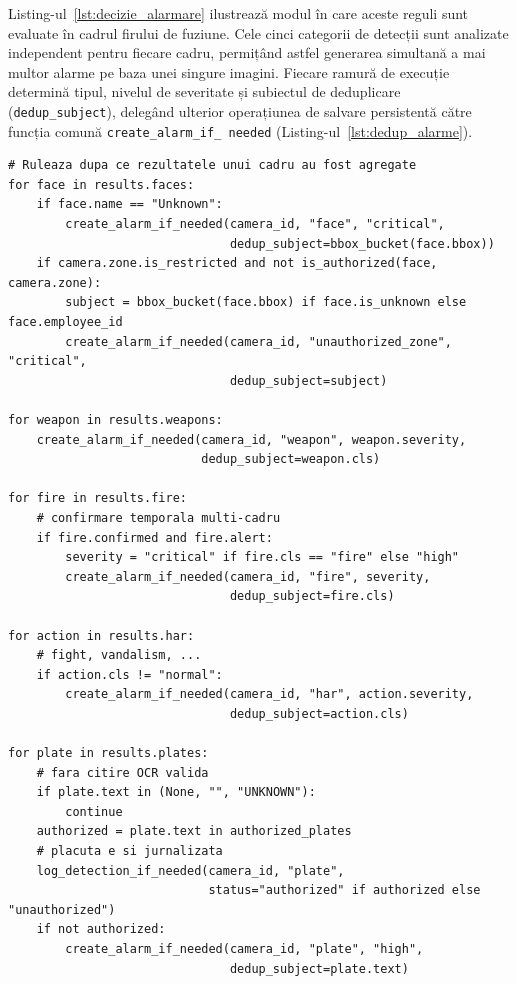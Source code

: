 \documentclass[../../main.tex]{subfiles}
\begin{document}
Listing-ul~\ref{lst:decizie_alarmare} ilustrează modul în care aceste reguli sunt evaluate în cadrul firului de fuziune. Cele cinci categorii de detecții sunt analizate independent pentru fiecare cadru, permițând astfel generarea simultană a mai multor alarme pe baza unei singure imagini. Fiecare ramură de execuție determină tipul, nivelul de severitate și subiectul de deduplicare (\texttt{dedup\_subject}), delegând ulterior operațiunea de salvare persistentă către funcția comună \texttt{create\_alarm\_if\_ \linebreak needed} (Listing-ul~\ref{lst:dedup_alarme}).

\begin{listing}[H]
\begin{verbatim}
# Ruleaza dupa ce rezultatele unui cadru au fost agregate
for face in results.faces:
    if face.name == "Unknown":
        create_alarm_if_needed(camera_id, "face", "critical",
                               dedup_subject=bbox_bucket(face.bbox))
    if camera.zone.is_restricted and not is_authorized(face, camera.zone):
        subject = bbox_bucket(face.bbox) if face.is_unknown else face.employee_id
        create_alarm_if_needed(camera_id, "unauthorized_zone", "critical",
                               dedup_subject=subject)

for weapon in results.weapons:
    create_alarm_if_needed(camera_id, "weapon", weapon.severity,
                           dedup_subject=weapon.cls)

for fire in results.fire:
    # confirmare temporala multi-cadru
    if fire.confirmed and fire.alert:
        severity = "critical" if fire.cls == "fire" else "high"
        create_alarm_if_needed(camera_id, "fire", severity,
                               dedup_subject=fire.cls)

for action in results.har:
    # fight, vandalism, ...
    if action.cls != "normal":
        create_alarm_if_needed(camera_id, "har", action.severity,
                               dedup_subject=action.cls)

for plate in results.plates:
    # fara citire OCR valida
    if plate.text in (None, "", "UNKNOWN"):
        continue
    authorized = plate.text in authorized_plates
    # placuta e si jurnalizata
    log_detection_if_needed(camera_id, "plate",
                            status="authorized" if authorized else "unauthorized")
    if not authorized:
        create_alarm_if_needed(camera_id, "plate", "high",
                               dedup_subject=plate.text)
\end{verbatim}
\caption{Decizia de alarmare pentru un cadru, în firul de fuziune (\texttt{app.py}).}
\label{lst:decizie_alarmare}
\end{listing}
\end{document}
